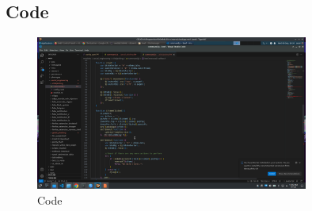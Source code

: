 \documentclass{report}
\begin{document}
\pagebreak

\subsection{Code}
\begin{figure}[!htbp]
    \centering
    \includegraphics[width=0.8\textwidth]{ClickJacking/code.png}
    \caption{Code}
    \label{fig:cj3}
\end{figure}

\pagebreak
\end{document}
